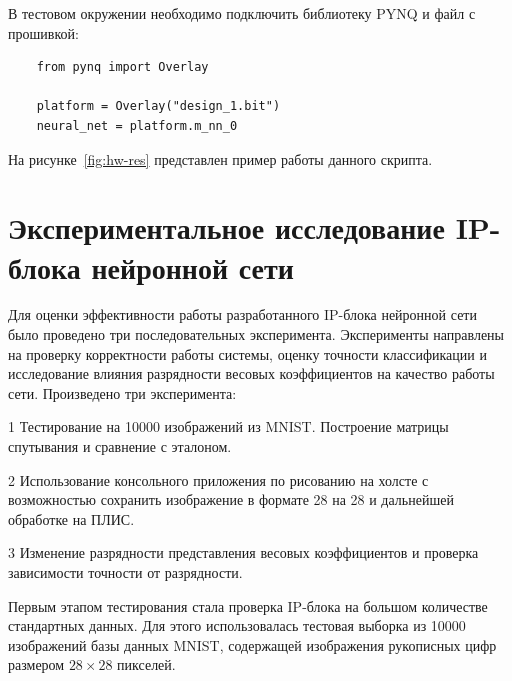 В тестовом окружении необходимо подключить библиотеку PYNQ и файл с прошивкой:

\small
\fontsize{12pt}{12pt}\selectfont
\begin{verbatim}
    from pynq import Overlay 

    platform = Overlay("design_1.bit")
    neural_net = platform.m_nn_0
\end{verbatim}
\normalsize
\fontsize{14pt}{14pt}\selectfont

На рисунке~\ref{fig:hw-res} представлен пример работы данного скрипта.


\section{Экспериментальное исследование IP-блока нейронной сети}\par
\hspace*{12.5 mm}Для оценки эффективности работы разработанного IP-блока 
нейронной сети было проведено три последовательных эксперимента. Эксперименты 
направлены на проверку корректности работы системы, оценку точности 
классификации и исследование влияния разрядности весовых коэффициентов на 
качество работы сети. Произведено три эксперимента:

    1 Тестирование на 10000 изображений из MNIST. Построение матрицы спутывания
    и сравнение с эталоном.

    2 Использование консольного приложения по рисованию на холсте с 
    возможностью сохранить изображение в формате 28 на 28 и дальнейшей 
    обработке на ПЛИС.

    3 Изменение разрядности представления весовых коэффициентов и проверка 
    зависимости точности от разрядности.

\anonsection{}Первым этапом тестирования стала проверка IP-блока на большом 
количестве стандартных данных. Для этого использовалась тестовая выборка из 
10000 изображений базы данных MNIST, содержащей изображения рукописных цифр 
размером $28\times28$ пикселей.

